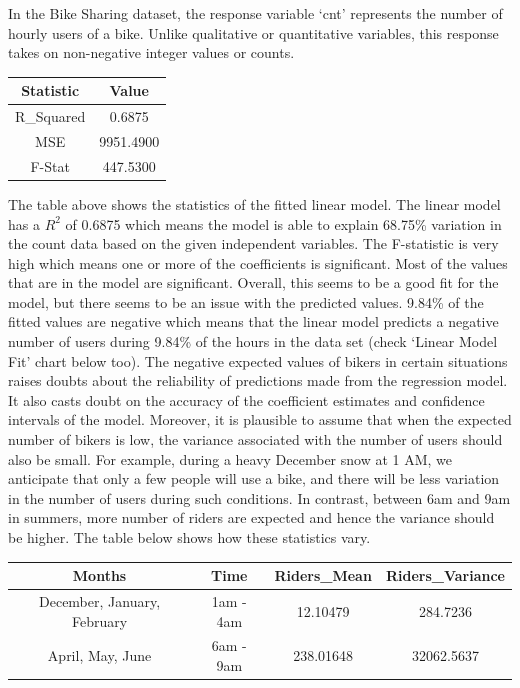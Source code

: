 \documentclass[
]{article}
\begin{document}
In the Bike Sharing dataset, the response variable `cnt' represents the
number of hourly users of a bike. Unlike qualitative or quantitative
variables, this response takes on non-negative integer values or counts.

\begin{table}
\centering
\begin{tabular}{c|c}
\hline
Statistic & Value\\
\hline
R\_Squared & 0.6875\\
\hline
MSE & 9951.4900\\
\hline
F-Stat & 447.5300\\
\hline
\end{tabular}
\end{table}

The table above shows the statistics of the fitted linear model. The
linear model has a \(R^2\) of 0.6875 which means the model is able to
explain 68.75\% variation in the count data based on the given
independent variables. The F-statistic is very high which means one or
more of the coefficients is significant. Most of the values that are in
the model are significant. Overall, this seems to be a good fit for the
model, but there seems to be an issue with the predicted values. 9.84\%
of the fitted values are negative which means that the linear model
predicts a negative number of users during 9.84\% of the hours in the
data set (check `Linear Model Fit' chart below too). The negative
expected values of bikers in certain situations raises doubts about the
reliability of predictions made from the regression model. It also casts
doubt on the accuracy of the coefficient estimates and confidence
intervals of the model. Moreover, it is plausible to assume that when
the expected number of bikers is low, the variance associated with the
number of users should also be small. For example, during a heavy
December snow at 1 AM, we anticipate that only a few people will use a
bike, and there will be less variation in the number of users during
such conditions. In contrast, between 6am and 9am in summers, more
number of riders are expected and hence the variance should be higher.
The table below shows how these statistics vary.

\begin{table}
\centering
\begin{tabular}{c|c|c|c}
\hline
Months & Time & Riders\_Mean & Riders\_Variance\\
\hline
December, January, February & 1am - 4am & 12.10479 & 284.7236\\
\hline
April, May, June & 6am - 9am & 238.01648 & 32062.5637\\
\hline
\end{tabular}
\end{table}
\end{document}
